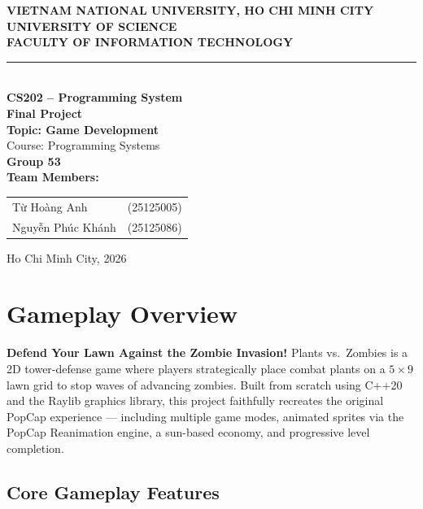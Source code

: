 \documentclass[12pt,a4paper]{article}
\begin{document}
\hypersetup{pageanchor=false}
\begin{titlepage}
    \centering
    {\large\bfseries VIETNAM NATIONAL UNIVERSITY, HO CHI MINH CITY}\\[4pt]
    {\large\bfseries UNIVERSITY OF SCIENCE}\\[4pt]
    {\large\bfseries FACULTY OF INFORMATION TECHNOLOGY}\\[6pt]
    \rule{\textwidth}{1pt}\\[1.5cm]
    {\LARGE\bfseries CS202 -- Programming System}\\[0.8cm]
    {\Huge\bfseries Final Project}\\[0.6cm]
    {\Large\bfseries Topic: Game Development}\\[0.4cm]
    {\Large Course: Programming Systems}\\[2cm]
    {\large\bfseries Group 53}\\[0.5cm]
    {\large\bfseries Team Members:}\\[0.5cm]
    \begin{tabular}{l l}
        Từ Hoàng Anh      & (25125005) \\[4pt]
        Nguyễn Phúc Khánh & (25125086) \\
    \end{tabular}
    \vfill
    {\large Ho Chi Minh City, 2026}
\end{titlepage}
\hypersetup{pageanchor=true}
\tableofcontents
\clearpage
{}
\section{Gameplay Overview}
\textbf{Defend Your Lawn Against the Zombie Invasion!}
Plants vs.\ Zombies is a 2D tower-defense game where players strategically place combat plants on a $5 \times 9$ lawn grid to stop waves of advancing zombies. Built from scratch using C++20 and the Raylib graphics library, this project faithfully recreates the original PopCap experience --- including multiple game modes, animated sprites via the PopCap Reanimation engine, a sun-based economy, and progressive level completion.
\subsection{Core Gameplay Features}
\end{document}
